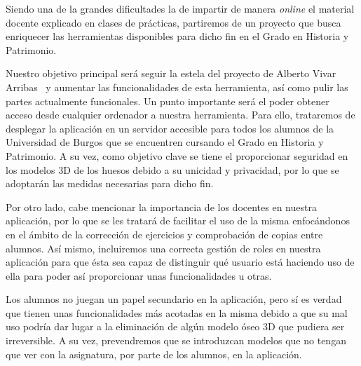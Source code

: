 
Siendo una de la grandes dificultades la de impartir de manera \textit{online} el material docente explicado en clases de prácticas, partiremos de un proyecto que busca enriquecer las herramientas disponibles para dicho fin en el Grado en Historia y Patrimonio.

Nuestro objetivo principal será seguir la estela del proyecto de Alberto Vivar Arribas~\cite{github:alberto-viewer} y aumentar las funcionalidades de esta herramienta, así como pulir las partes actualmente funcionales. Un punto importante será el poder obtener acceso desde cualquier ordenador a nuestra herramienta. Para ello, trataremos de desplegar la aplicación en un servidor accesible para todos los alumnos de la Universidad de Burgos que se encuentren cursando el Grado en Historia y Patrimonio. A su vez, como objetivo clave se tiene el proporcionar seguridad en los modelos 3D de los huesos debido a su unicidad y privacidad, por lo que se adoptarán las medidas necesarias para dicho fin.

Por otro lado, cabe mencionar la importancia de los docentes en nuestra aplicación, por lo que se les tratará de facilitar el uso de la misma enfocándonos en el ámbito de la corrección de ejercicios y comprobación de copias entre alumnos. Así mismo, incluiremos una correcta gestión de roles en nuestra aplicación para que ésta sea capaz de distinguir qué usuario está haciendo uso de ella para poder así proporcionar unas funcionalidades u otras.

Los alumnos no juegan un papel secundario en la aplicación, pero sí es verdad que tienen unas funcionalidades más acotadas en la misma debido a que su mal uso podría dar lugar a la eliminación de algún modelo óseo 3D que pudiera ser irreversible. A su vez, prevendremos que se introduzcan modelos que no tengan que ver con la asignatura, por parte de los alumnos, en la aplicación.
